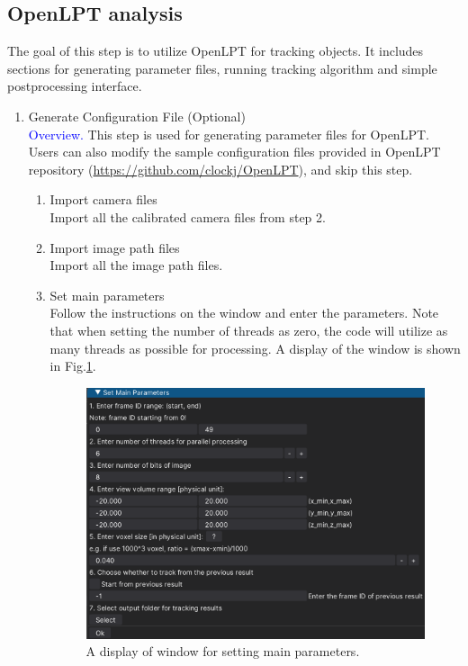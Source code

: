 \documentclass[a4paper,fleqn]{article}
\begin{document}
\subsection{OpenLPT analysis}
The goal of this step is to utilize OpenLPT for tracking objects. It includes sections for generating parameter files, running tracking algorithm and simple postprocessing interface. 

\begin{enumerate}
    \item Generate Configuration File (Optional)\\
    \textcolor{blue}{Overview.} This step is used for generating parameter files for OpenLPT. Users can also modify the sample configuration files provided in OpenLPT repository (\url{https://github.com/clockj/OpenLPT}), and skip this step.
        \begin{enumerate}
            \item Import camera files\\
            Import all the calibrated camera files from step 2.

            \item Import image path files\\ 
            Import all the image path files.

            \item Set main parameters\\
            Follow the instructions on the window and enter the parameters. Note that when setting the number of threads as zero, the code will utilize as many threads as possible for processing. A display of the window is shown in Fig.\ref{fig:GUI_lpt_mainParam}.

            \begin{figure}[h]
                \centering
                \includegraphics[width=\linewidth]{Fig/GUI_lpt_mainParam.png}
                \caption{A display of window for setting main parameters.}
                \label{fig:GUI_lpt_mainParam}
            \end{figure}


\end{enumerate}
\end{enumerate}
\end{document}
